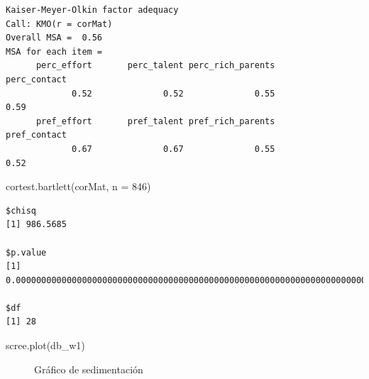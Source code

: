 \documentclass[
  12pt,
]{article}
\newenvironment{Shaded}{\begin{snugshade}}{\end{snugshade}}
\newcommand{\AttributeTok}[1]{\textcolor[rgb]{0.40,0.45,0.13}{#1}}
\newcommand{\DecValTok}[1]{\textcolor[rgb]{0.68,0.00,0.00}{#1}}
\newcommand{\FunctionTok}[1]{\textcolor[rgb]{0.28,0.35,0.67}{#1}}
\newcommand{\NormalTok}[1]{\textcolor[rgb]{0.00,0.23,0.31}{#1}}
\begin{document}
\begin{verbatim}
Kaiser-Meyer-Olkin factor adequacy
Call: KMO(r = corMat)
Overall MSA =  0.56
MSA for each item = 
      perc_effort       perc_talent perc_rich_parents      perc_contact 
             0.52              0.52              0.55              0.59 
      pref_effort       pref_talent pref_rich_parents      pref_contact 
             0.67              0.67              0.55              0.52 
\end{verbatim}

\begin{Shaded}
\begin{Highlighting}[]
\FunctionTok{cortest.bartlett}\NormalTok{(corMat, }\AttributeTok{n =} \DecValTok{846}\NormalTok{)}
\end{Highlighting}
\end{Shaded}

\begin{verbatim}
$chisq
[1] 986.5685

$p.value
[1] 0.0000000000000000000000000000000000000000000000000000000000000000000000000000000000000000000000000000000000000000000000000000000000000000000000000000000000000000000000000000000000000000000009929485

$df
[1] 28
\end{verbatim}

\begin{Shaded}
\begin{Highlighting}[]
\FunctionTok{scree.plot}\NormalTok{(db\_w1)}
\end{Highlighting}
\end{Shaded}

\begin{figure}[H]

\caption{\label{fig-scree}Gráfico de sedimentación}


\end{figure}%
\end{document}
